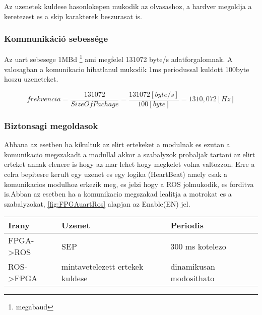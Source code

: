 Az uzenetek kuldese hasonlokepen mukodik az olvasashoz, a hardver megoldja a keretezest es a skip karakterek beszurasat is.




\subsubsection{Kommunikáció sebessége}

Az uart sebesege 1MBd \footnote{megabaud} ami megfelel 131072 byte/s adatforgalomnak. A valosagban a komunikacio hibatlanul mukodik 1ms periodussal kuldott 100byte hoszu uzeneteket.

\begin{equation}
    frekvencia = \frac{131072}{SizeOfPachage}=\frac{131072[byte/s]}{100[byte]}=1310,072 [Hz]
\end{equation}

\subsubsection{Biztonsagi megoldasok}

Abbana az esetben ha kikultuk az elirt ertekeket a modulnak es ezutan a komunikacio megszakadt a modullal akkor a szabalyzok probaljak tartani az elirt erteket annak elenere is hogy az mar lehet hogy megkelet volna valtozzon. Erre a celra bepitesre kerult egy uzenet es egy logika (HeartBeat) amely csak a komunikacios modulhoz erkezik meg, es jelzi hogy a ROS jolmukodik, es forditva is.Abban az esetben ha a komunikacio megszakad lealitja a motrokat es a szabalyzokat,  \ref{fig:FPGAuartRos} alapjan az Enable(EN) jel.

\begin{table}[H]
\center
\begin{tabular}{lll}
\hline Irany   & Uzenet & Periodis    \\ \hline
FPGA->ROS &  SEP        & 300 ms kotelezo         \\
ROS->FPGA &  mintavetelezett ertekek kuldese & dinamikusan modosithato                   
\end{tabular}
\end{table}















